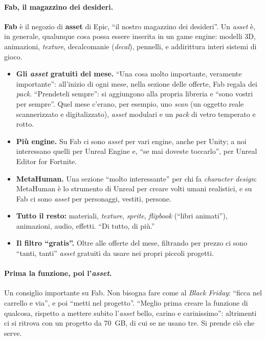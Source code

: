 \paragraph{Fab, il magazzino dei desideri.} \textbf{Fab} è il negozio di \textbf{asset}
di Epic, ``il nostro magazzino dei desideri''. Un \emph{asset} è, in generale,
qualunque cosa possa essere inserita in un game engine: modelli 3D, animazioni,
\emph{texture}, decalcomanie (\emph{decal}), pennelli, e addirittura interi sistemi di
gioco.
\begin{itemize}
  \item \textbf{Gli \emph{asset} gratuiti del mese.} ``Una cosa molto importante,
        veramente importante'': all'inizio di ogni mese, nella sezione delle offerte,
        Fab regala dei \emph{pack}. ``Prendeteli sempre'': si aggiungono alla propria
        libreria e ``sono vostri per sempre''. Quel mese c'erano, per esempio, uno
        \emph{scan} (un oggetto reale scannerizzato e digitalizzato), \emph{asset}
        modulari e un \emph{pack} di vetro temperato e rotto.
  \item \textbf{Più engine.} Su Fab ci sono \emph{asset} per vari engine, anche per
        Unity; a noi interessano quelli per Unreal Engine e, ``se mai doveste
        toccarlo'', per Unreal Editor for Fortnite.
  \item \textbf{MetaHuman.} Una sezione ``molto interessante'' per chi fa
        \emph{character design}: MetaHuman è lo strumento di Unreal per creare volti
        umani realistici, e su Fab ci sono \emph{asset} per personaggi, vestiti,
        persone.
  \item \textbf{Tutto il resto:} materiali, \emph{texture}, \emph{sprite},
        \emph{flipbook} (``libri animati''), animazioni, audio, effetti. ``Di tutto,
        di più.''
  \item \textbf{Il filtro ``gratis''.} Oltre alle offerte del mese, filtrando per prezzo
        ci sono ``tanti, tanti'' \emph{asset} gratuiti da usare nei propri piccoli
        progetti.
\end{itemize}

\paragraph{Prima la funzione, poi l'\emph{asset}.} Un consiglio importante su Fab. Non
bisogna fare come al \emph{Black Friday}: ``ficca nel carrello e via'', e poi
``metti nel progetto''. ``Meglio prima creare la funzione di qualcosa, rispetto a
mettere subito l'\emph{asset} bello, carino e carinissimo'': altrimenti ci si ritrova
con un progetto da 70~GB, di cui se ne usano tre. Si prende ciò che serve.

